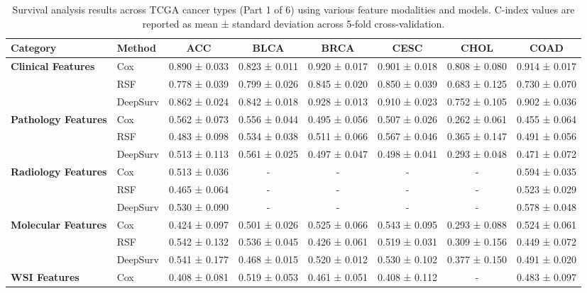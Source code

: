 \begin{sidewaystable}[htbp]
    \centering
    \caption{Survival analysis results across TCGA cancer types (Part 1 of 6) using various feature modalities and models. C-index values are reported as mean ± standard deviation across 5-fold cross-validation.}
    \label{tab:survival_results_1}
    \begin{tabular}{@{}llcccccc@{}}
        \toprule
        \textbf{Category} & \textbf{Method} & \textbf{ACC} & \textbf{BLCA} & \textbf{BRCA} & \textbf{CESC} & \textbf{CHOL} & \textbf{COAD} \\
        \midrule
        \multirow{3}{*}{\textbf{Clinical Features}} & Cox & 0.890 ± 0.033 & 0.823 ± 0.011 & 0.920 ± 0.017 & 0.901 ± 0.018 & 0.808 ± 0.080 & 0.914 ± 0.017 \\
        & RSF & 0.778 ± 0.039 & 0.799 ± 0.026 & 0.845 ± 0.020 & 0.850 ± 0.039 & 0.683 ± 0.125 & 0.730 ± 0.070 \\
        & DeepSurv & 0.862 ± 0.024 & 0.842 ± 0.018 & 0.928 ± 0.013 & 0.910 ± 0.023 & 0.752 ± 0.105 & 0.902 ± 0.036 \\
        \midrule
        \multirow{3}{*}{\textbf{Pathology Features}} & Cox & 0.562 ± 0.073 & 0.556 ± 0.044 & 0.495 ± 0.056 & 0.507 ± 0.026 & 0.262 ± 0.061 & 0.455 ± 0.064 \\
        & RSF & 0.483 ± 0.098 & 0.534 ± 0.038 & 0.511 ± 0.066 & 0.567 ± 0.046 & 0.365 ± 0.147 & 0.491 ± 0.056 \\
        & DeepSurv & 0.513 ± 0.113 & 0.561 ± 0.025 & 0.497 ± 0.047 & 0.498 ± 0.041 & 0.293 ± 0.048 & 0.471 ± 0.072 \\
        \midrule
        \multirow{3}{*}{\textbf{Radiology Features}} & Cox & 0.513 ± 0.036 & - & - & - & - & 0.594 ± 0.035 \\
        & RSF & 0.465 ± 0.064 & - & - & - & - & 0.523 ± 0.029 \\
        & DeepSurv & 0.530 ± 0.090 & - & - & - & - & 0.578 ± 0.048 \\
        \midrule
        \multirow{3}{*}{\textbf{Molecular Features}} & Cox & 0.424 ± 0.097 & 0.501 ± 0.026 & 0.525 ± 0.066 & 0.543 ± 0.095 & 0.293 ± 0.088 & 0.524 ± 0.061 \\
        & RSF & 0.542 ± 0.132 & 0.536 ± 0.045 & 0.426 ± 0.061 & 0.519 ± 0.031 & 0.309 ± 0.156 & 0.449 ± 0.072 \\
        & DeepSurv & 0.541 ± 0.177 & 0.468 ± 0.015 & 0.520 ± 0.012 & 0.530 ± 0.102 & 0.377 ± 0.150 & 0.491 ± 0.020 \\
        \midrule
        \multirow{3}{*}{\textbf{WSI Features}} & Cox & 0.408 ± 0.081 & 0.519 ± 0.053 & 0.461 ± 0.051 & 0.408 ± 0.112 & - & 0.483 ± 0.097 \\

\end{tabular}
\end{sidewaystable}
